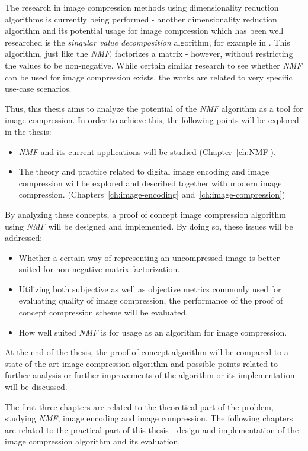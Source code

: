 \documentclass[thesis=M,english]{FITthesis}[2012/10/20]
\begin{document}
The research in image compression methods using dimensionality reduction algorithms is currently being
performed - another dimensionality reduction algorithm and its potential usage for image compression 
which has been well researched is the \emph{singular value decomposition} algorithm, for example
in \cite{svd-compression}. This algorithm, just like the \emph{NMF}, factorizes a matrix - however, without
restricting the values to be non-negative. While certain similar research to see whether
\emph{NMF} can be used for image compression exists, the works are related to very
specific use-case scenarios.

Thus, this thesis aims to analyze the potential of the \emph{NMF} algorithm
as a tool for image compression. In order to achieve this, the following points
will be explored in the thesis:
\begin{itemize}[topsep=0pt]
  \item \emph{NMF} and its current applications will be studied (Chapter~\ref{ch:NMF}).
  \item The theory and practice related to digital image encoding and image
        compression will be explored and described together with
        modern image compression. (Chapters~\ref{ch:image-encoding} and~\ref{ch:image-compression})
\end{itemize}

By analyzing these concepts, a proof of concept image compression algorithm using
\emph{NMF} will be designed and implemented. By doing so, these issues will be
addressed:
\begin{itemize}[topsep=0pt]
  \item Whether a certain way of representing an uncompressed image is better
        suited for non-negative matrix factorization.
  \item Utilizing both subjective as well as objective metrics commonly used
        for evaluating quality of image compression, the performance of
        the proof of concept compression scheme will be evaluated.
  \item How well suited \emph{NMF} is for usage as an algorithm for image
        compression.
\end{itemize} 
At the end of the thesis, the proof of concept algorithm will be compared to
a state of the art image compression algorithm and possible points related
to further analysis or further improvements of the algorithm or its implementation
will be discussed.

The first three chapters are related to the theoretical part of the problem, studying
\emph{NMF}, image encoding and image compression. The following chapters are related
to the practical part of this thesis - design and implementation of the image
compression algorithm and its evaluation.
\end{document}
